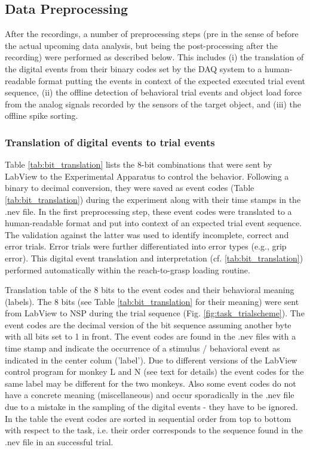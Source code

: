 {\subsection{Data Preprocessing}
\label{sec:data_preprocessing}

After the recordings, a number of preprocessing steps (pre in the sense of before the actual upcoming data analysis, but being the post-processing after the recording) were performed as described below. This includes (i) the translation of the digital events from their binary codes set by the DAQ system to a human-readable format putting the events in context of the expected executed trial event sequence, (ii) the offline detection of behavioral trial events and object load force from the analog signals recorded by the sensors of the target object, and (iii) the offline spike sorting.

\subsubsection{Translation of digital events to trial events }

Table \cref{tab:bit_translation} lists the 8-bit combinations that were sent by LabView to the Experimental Apparatus to control the behavior. Following a binary to decimal conversion, they were saved as event codes (Table \cref{tab:bit_translation}) during the experiment along with their time stamps in the .nev file. In the first preprocessing step, these event codes were translated to a human-readable format and put into context of an expected trial event sequence. The validation against the latter was used to identify incomplete, correct and error trials. Error trials were further differentiated into error types (e.g., grip error). This digital event translation and interpretation (cf. \cref{tab:bit_translation}) performed automatically within the reach-to-grasp loading routine. 

Translation table of the 8 bits to the event codes and their behavioral meaning (labels). The 8 bits (see Table \cref{tab:bit_translation} for their meaning) were sent from LabView to NSP during the trial sequence (Fig. \cref{fig:task_trialscheme}). The event codes are the decimal version of the bit sequence assuming another byte with all bits set to 1 in front. The event codes are found in the .nev files with a time stamp and indicate the occurrence of a stimulus / behavioral event as indicated in the center colum ('label'). Due to different versions of the LabView control program for monkey L and N (see text for details) the event codes for the same label may be different for the two monkeys. Also some event codes do not have a concrete meaning (miscellaneous) and occur sporadically in the .nev file due to a mistake in the sampling of the digital events - they have to be ignored. In the table the event codes are sorted in sequential order from top to bottom with respect to the task, i.e. their order corresponds to the sequence found in the .nev file in an successful trial. 

}
